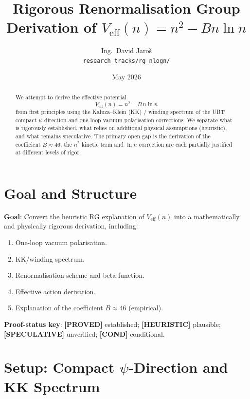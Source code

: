 \documentclass[11pt,a4paper]{article}
\title{Rigorous Renormalisation Group Derivation of $V_\mathrm{eff}(n) = n^2 - Bn\ln n$}
\author{Ing.\ David Jaro\v{s}\\
\small \texttt{research\_tracks/rg\_nlogn/}}
\date{May 2026}
\newcommand{\proved}[1]{\textbf{[PROVED]} #1}
\newcommand{\heuristic}[1]{\textbf{[HEURISTIC]} #1}
\newcommand{\speculative}[1]{\textbf{[SPECULATIVE]} #1}
\newcommand{\cond}[1]{\textbf{[COND]} #1}
\begin{document}
\maketitle

\begin{abstract}
We attempt to derive the effective potential
\[
  V_\mathrm{eff}(n) = n^2 - B\, n\ln n
\]
from first principles using the Kaluza--Klein (KK) / winding spectrum of the
UBT compact $\psi$-direction and one-loop vacuum polarisation corrections.
We separate what is rigorously established, what relies on additional physical
assumptions (heuristic), and what remains speculative.  The primary open gap
is the derivation of the coefficient $B \approx 46$; the $n^2$ kinetic term
and $\ln n$ correction are each partially justified at different levels of rigor.
\end{abstract}

\tableofcontents

\section{Goal and Structure}

\textbf{Goal}: Convert the heuristic RG explanation of $V_\mathrm{eff}(n)$
into a mathematically and physically rigorous derivation, including:
\begin{enumerate}
  \item One-loop vacuum polarisation.
  \item KK/winding spectrum.
  \item Renormalisation scheme and beta function.
  \item Effective action derivation.
  \item Explanation of the coefficient $B \approx 46$ (empirical).
\end{enumerate}

\textbf{Proof-status key}: \proved{} established; \heuristic{} plausible;
\speculative{} unverified; \cond{} conditional.

\section{Setup: Compact \texorpdfstring{$\psi$}{psi}-Direction and KK Spectrum}
\end{document}
